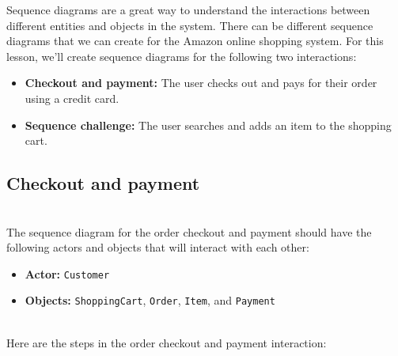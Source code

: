 

Sequence diagrams are a great way to understand the interactions between different entities and objects in the system. There can be different sequence diagrams that we can create for the Amazon online shopping system. For this lesson, we'll create sequence diagrams for the following two interactions:

\begin{itemize}
\item
\protect{}\label{UleKBEA74d9oATlVM7THK}
\textbf{Checkout and payment:} The user checks out and pays for their order using a credit card.
\item
\protect{}\label{dAwAeCojFF6KbTWo7gkjc}
\textbf{Sequence challenge:} The user searches and adds an item to the shopping cart.
\end{itemize}

\subsection{Checkout and payment}\label{uwBhDA-E6PbQBajODofA_}
\\
The sequence diagram for the order checkout and payment should have the following actors and objects that will interact with each other:

\begin{itemize}
\item
\protect{}\label{1aCST-NKtYFj9aPHMPHW-}
\textbf{Actor:} \texttt{Customer}
\item
\protect{}\label{6j90pMyjVRuuMHAVwbLLO}
\textbf{Objects:} \texttt{ShoppingCart}, \texttt{Order}, \texttt{Item}, and \texttt{Payment}
\end{itemize}
\\
Here are the steps in the order checkout and payment interaction:

